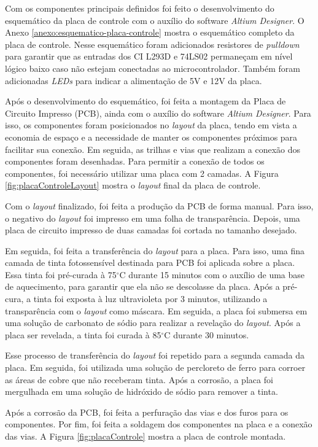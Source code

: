 Com os componentes principais definidos foi feito o desenvolvimento do esquemático da placa de controle com o auxílio do software \textit{Altium Designer}.
O Anexo \ref{anexo:esquematico-placa-controle} mostra o esquemático completo da placa de controle.
Nesse esquemático foram adicionados resistores de \textit{pulldown} para garantir que as entradas dos CI L293D e 74LS02 permaneçam em nível lógico baixo caso não estejam conectadas ao microcontrolador.
Também foram adicionadas \textit{LEDs} para indicar a alimentação de 5V e 12V da placa.

Após o desenvolvimento do esquemático, foi feita a montagem da Placa de Circuito Impresso (PCB), ainda com o auxílio do software \textit{Altium Designer}.
Para isso, os componentes foram posicionados no \textit{layout} da placa, tendo em vista a economia de espaço e a necessidade de manter os componentes próximos para facilitar sua conexão.
Em seguida, as trilhas e vias que realizam a conexão dos componentes foram desenhadas. 
Para permitir a conexão de todos os componentes, foi necessário utilizar uma placa com 2 camadas.
A Figura \ref{fig:placaControleLayout} mostra o \textit{layout} final da placa de controle.

Com o \textit{layout} finalizado, foi feita a produção da PCB de forma manual.
Para isso, o negativo do \textit{layout} foi impresso em uma folha de transparência.
Depois, uma placa de circuito impresso de duas camadas foi cortada no tamanho desejado.

Em seguida, foi feita a transferência do \textit{layout} para a placa.
Para isso, uma fina camada de tinta fotossensível destinada para PCB foi aplicada sobre a placa.
Essa tinta foi pré-curada à 75$^{\circ}$C durante 15 minutos com o auxílio de uma base de aquecimento, para garantir que ela não se descolasse da placa.
Após a pré-cura, a tinta foi exposta à luz ultravioleta por 3 minutos, utilizando a transparência com o \textit{layout} como máscara.
Em seguida, a placa foi submersa em uma solução de carbonato de sódio para realizar a revelação do \textit{layout}.
Após a placa ser revelada, a tinta foi curada à 85$^{\circ}$C durante 30 minutos.

Esse processo de transferência do \textit{layout} foi repetido para a segunda camada da placa.
Em seguida, foi utilizada uma solução de percloreto de ferro para corroer as áreas de cobre que não receberam tinta.
Após a corrosão, a placa foi mergulhada em uma solução de hidróxido de sódio para remover a tinta.

Após a corrosão da PCB, foi feita a perfuração das vias e dos furos para os componentes.
Por fim, foi feita a soldagem dos componentes na placa e a conexão das vias.
A Figura \ref{fig:placaControle} mostra a placa de controle montada.

